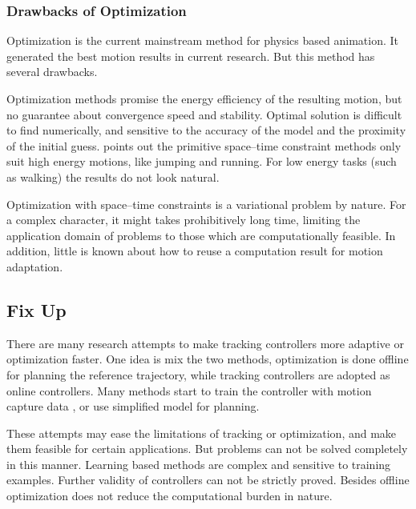 \subsubsection*{Drawbacks of Optimization}
Optimization is the current mainstream method for physics based animation.
It generated the best motion results in current research.
But this method has several drawbacks.

\begin{itemize}
Optimization methods promise the energy efficiency of the resulting motion, but no guarantee about convergence speed and stability.
Optimal solution is difficult to find numerically, and sensitive to the accuracy of the model and the proximity of the initial guess.
\citet{Liu2005} points out the primitive space–time constraint methods only suit high energy motions, like jumping and running.
For low energy tasks (such as walking) the results do not look natural.

Optimization with space–time constraints is a variational problem by nature. 
For a complex character, it might takes  prohibitively long time, limiting the application domain of problems to those which are computationally feasible. 
In addition, little is known about how to reuse a computation result for motion adaptation.
\end{itemize}


\subsection{Fix Up}
There are many research attempts to make tracking controllers more adaptive or optimization faster.
One idea is mix the two methods, optimization is done offline for planning the reference trajectory, while tracking controllers are adopted as online controllers.
Many methods start to train the controller with motion capture data \citep{levine2011space,coros2010generalized,de2010feature,wei2011physically,ye2010optimal,lee2010motion,wang2010optimizing,wu2010terrain,liu2010sampling,lee2010data}, or use simplified model for planning\citep{mordatch2010robust}.


These attempts may ease the limitations of tracking or optimization, and make them feasible for certain applications.
But \cms problems can not be solved completely in this manner.
Learning based methods are complex and  sensitive to training examples.
Further validity of controllers can not be strictly proved.
Besides  offline optimization  does not reduce the computational burden in nature.




